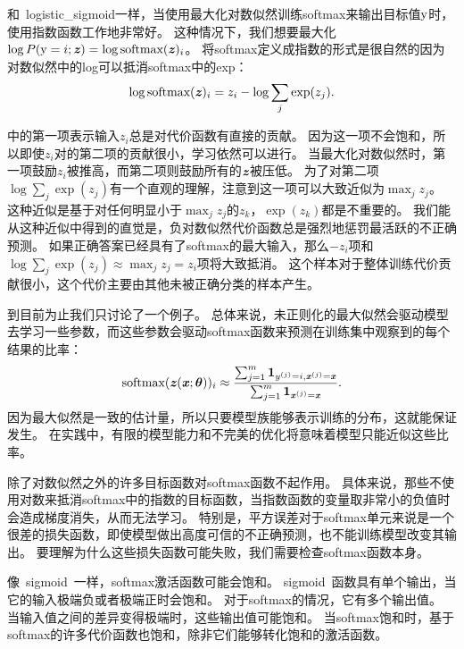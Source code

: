 和~\gls{logistic_sigmoid}一样，当使用最大化对数似然训练softmax来输出目标值$\mathrm{y}$时，使用指数函数工作地非常好。
这种情况下，我们想要最大化$\log P(\mathrm{y} =i; \boldsymbol{\mathit{z}})=\log \text{softmax}(\boldsymbol{\mathit{z}})_i$。
将softmax定义成指数的形式是很自然的因为对数似然中的log可以抵消softmax中的exp：
\begin{equation}
\log \text{softmax}(\boldsymbol{\mathit{z}})_i = z_i - \log \sum_j \exp(z_j).
\label{eq:6.30}
\end{equation}


中的第一项表示输入$z_i$总是对代价函数有直接的贡献。
因为这一项不会饱和，所以即使$z_i$对的第二项的贡献很小，学习依然可以进行。
当最大化对数似然时，第一项鼓励$z_i$被推高，而第二项则鼓励所有的$\boldsymbol{\mathit{z}}$被压低。
为了对第二项$\log \sum_j \exp(z_j)$有一个直观的理解，注意到这一项可以大致近似为$\max_j z_j$。
这种近似是基于对任何明显小于$\max_j z_j$的$z_k$，$\exp(z_k)$都是不重要的。
我们能从这种近似中得到的直觉是，负对数似然代价函数总是强烈地惩罚最活跃的不正确预测。
如果正确答案已经具有了softmax的最大输入，那么$-z_i$项和$\log\sum_j \exp(z_j) \approx \max_j z_j = z_i$项将大致抵消。
这个样本对于整体训练代价贡献很小，这个代价主要由其他未被正确分类的样本产生。

到目前为止我们只讨论了一个例子。
总体来说，未正则化的最大似然会驱动模型去学习一些参数，而这些参数会驱动softmax函数来预测在训练集中观察到的每个结果的比率：
\begin{equation}
\text{softmax}(\boldsymbol{\mathit{z}}(\boldsymbol{\mathit{x}}; \boldsymbol{\theta}))_i \approx \frac{\sum_{j=1}^m \bm{1}_{y^{(j)}=i, \boldsymbol{\mathit{x}}^{(j)} = \boldsymbol{\mathit{x}}}  }{ \sum_{j=1}^{m} \bm{1}_{\boldsymbol{\mathit{x}}^{(j)} = \boldsymbol{\mathit{x}}} }.
\end{equation}
因为最大似然是一致的估计量，所以只要模型族能够表示训练的分布，这就能保证发生。
在实践中，有限的模型能力和不完美的优化将意味着模型只能近似这些比率。

除了对数似然之外的许多目标函数对softmax函数不起作用。
具体来说，那些不使用对数来抵消softmax中的指数的目标函数，当指数函数的变量取非常小的负值时会造成梯度消失，从而无法学习。
特别是，平方误差对于softmax单元来说是一个很差的损失函数，即使模型做出高度可信的不正确预测，也不能训练模型改变其输出\citep{Bridle90}。
要理解为什么这些损失函数可能失败，我们需要检查softmax函数本身。

像~\gls{sigmoid}~一样，softmax激活函数可能会饱和。
\gls{sigmoid}~函数具有单个输出，当它的输入极端负或者极端正时会饱和。
对于softmax的情况，它有多个输出值。
当输入值之间的差异变得极端时，这些输出值可能饱和。
当softmax饱和时，基于softmax的许多代价函数也饱和，除非它们能够转化饱和的激活函数。

